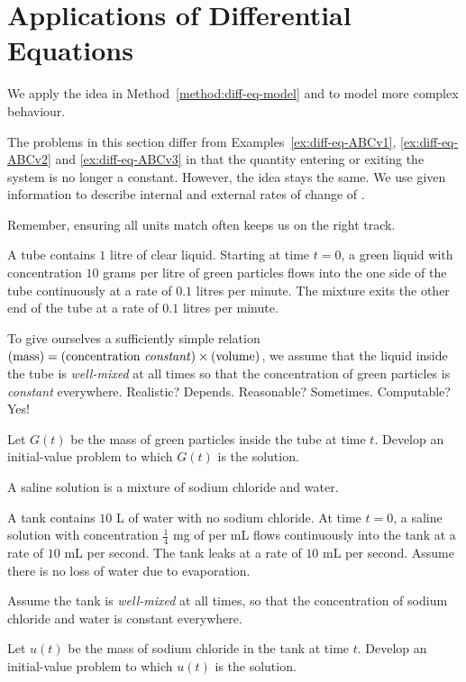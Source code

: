 \documentclass[../main.tex]{subfiles}
\begin{document}
 \section{Applications of Differential Equations}
We apply the idea in Method~\ref{method:diff-eq-model} and to model more complex behaviour. 

The problems in this section differ from Examples~\ref{ex:diff-eq-ABCv1}, \ref{ex:diff-eq-ABCv2} and \ref{ex:diff-eq-ABCv3} in that the quantity entering or exiting the system is no longer a constant. However, the idea stays the same. We use given information to describe internal and external rates of change of .

\faStar{} Remember, ensuring all units match often keeps us on the right track.

\begin{example}
  A tube contains \(1\) litre of clear liquid. Starting at time \(t = 0\), a green liquid with concentration \(10\) grams per litre of green particles flows into the one side of the tube continuously at a rate of \(0.1\) litres per minute.  The mixture exits the other end of the tube at a rate of \(0.1\) litres per minute.

  To give ourselves a sufficiently simple relation \((\text{mass}) = (\text{concentration \emph{constant}}) \times (\text{volume})\), we assume that the liquid inside the tube is \emph{well-mixed} at all times so that the concentration of green particles is \emph{constant} everywhere. Realistic? Depends. Reasonable? Sometimes. Computable? Yes!

  Let \(G(t)\) be the mass of green particles inside the tube at time \(t\). Develop an initial-value problem to which \(G(t)\) is the solution.
  
\end{example}
\clearpage

\begin{example} \label{ex:diff-eq-model-mixing-1}
  A saline solution is a mixture of sodium chloride and water. 

  A tank contains \(10\) L of water with no sodium chloride. At time \(t = 0\), a saline solution with concentration \(\tfrac{1}{4}\) mg of per mL flows continuously into the tank at a rate of \(10\) mL per second. The tank leaks at a rate of \(10\) mL per second. Assume there is no loss of water due to evaporation.

  Assume the tank is \emph{well-mixed} at all times, so that the concentration of sodium chloride and water is constant everywhere. 

  Let \(u(t)\) be the mass of sodium chloride in the tank at time \(t\).  Develop an initial-value problem to which \(u(t)\) is the solution. 

\end{example}
\clearpage
\end{document}

